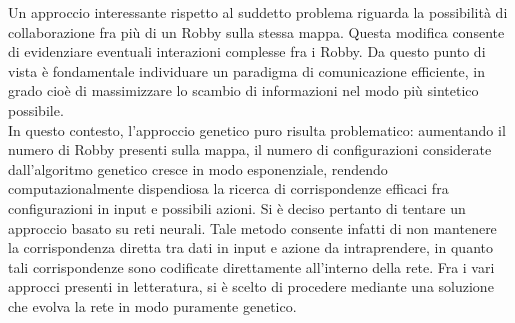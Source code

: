 Un approccio interessante rispetto al suddetto problema riguarda la possibilità
di collaborazione fra più di un Robby sulla stessa mappa. Questa modifica
consente di evidenziare eventuali interazioni complesse fra i Robby. Da questo
punto di vista è fondamentale individuare un paradigma di comunicazione
efficiente, in grado cioè di massimizzare lo scambio di informazioni nel modo
più sintetico possibile.\\

In questo contesto, l'approccio genetico puro risulta problematico:
aumentando il numero di Robby presenti sulla mappa, il numero di configurazioni
considerate dall'algoritmo genetico cresce in modo esponenziale, rendendo
computazionalmente dispendiosa la ricerca di corrispondenze efficaci fra
configurazioni in input e possibili azioni. Si è deciso pertanto di tentare
un approccio basato su reti neurali. Tale metodo consente infatti di non
mantenere la corrispondenza diretta tra dati in input e azione da intraprendere,
in quanto tali corrispondenze sono codificate direttamente all'interno della
rete. Fra i vari approcci presenti in letteratura, si è scelto di procedere
mediante una soluzione che evolva la rete in modo puramente genetico.